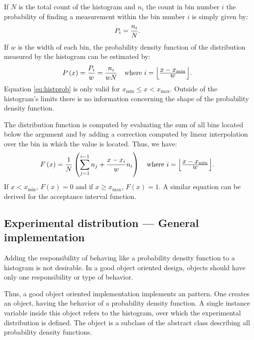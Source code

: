 \documentclass[twoside]{book}
\begin{document}
If $N$ is the total count of the histogram and $n_i$ the count in
bin number $i$ the probability of finding a measurement within the
bin number $i$ is simply given by:
\begin{equation}
  P_i={\displaystyle n_i \over\displaystyle N}.
\end{equation}
If $w$ is the width of each bin, the probability density function
of the distribution measured by the histogram can be estimated by:
\begin{equation}
\label{eq:histprob}
  P\left(x\right)={\displaystyle P_i \over\displaystyle w}
  ={\displaystyle n_i \over\displaystyle wN}\mbox{\quad
  where $i=\left\lfloor{\displaystyle x-x_{\min}\over\displaystyle w}\right\rfloor$.}
\end{equation}
Equation \ref{eq:histprob} is only valid for $x_{\min}\le x <
x_{\max}$. Outside of the histogram's limits there is no
information concerning the shape of the probability density
function.

The distribution function is computed by evaluating the sum of all
bins located below the argument and by adding a correction
computed by linear interpolation over the bin in which the value
is located. Thus, we have:
\begin{equation}
\label{eq:histdistr}
  F\left(x\right)={\displaystyle 1 \over\displaystyle N} \left(\sum_{j=1}^{i-1}n_j
  + {x-x_i \over w}n_i\right)
  \mbox{\quad where $i=\left\lfloor{\displaystyle x-x_{\min}\over\displaystyle w}\right\rfloor$.}
\end{equation}
If $x<x_{\min}$, $F\left(x\right)=0$ and if $x\geq x_{\max}$,
$F\left(x\right)=1$. A similar equation can be derived for the
acceptance interval function.

\subsection{Experimental distribution --- General  implementation}
 Adding the responsibility of
behaving like a probability density function to a histogram is not
desirable. In a good object oriented design, objects should have
only one responsibility or type of behavior.

Thus, a good object oriented implementation implements an
 pattern. One creates an object, having the
behavior of a probability density function. A single instance
variable inside this object refers to the histogram, over which
the experimental distribution is defined. The 
object is a subclass of the abstract class describing all
probability density functions.
\end{document}
